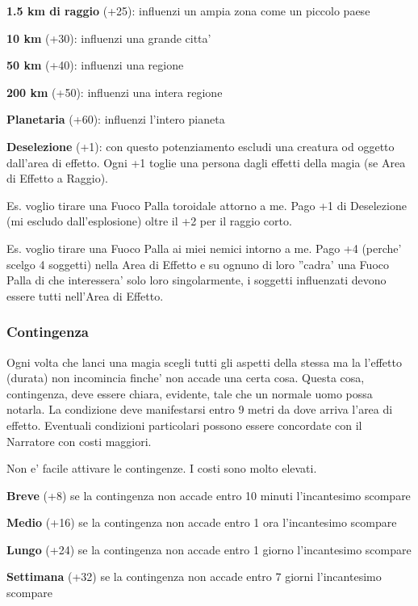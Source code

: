 \documentclass[a4paper,11pt,twoside,openany]{book}
\begin{document}
\textbf{1.5 km di raggio} (+25): influenzi un ampia zona come un piccolo paese

\textbf{10 km} (+30): influenzi una grande citta'

\textbf{50 km} (+40): influenzi una regione

\textbf{200 km} (+50): influenzi una intera regione

\textbf{Planetaria} (+60): influenzi l'intero pianeta

\textbf{Deselezione} (+1): con questo potenziamento escludi una creatura od oggetto dall'area di effetto. Ogni +1 toglie una persona dagli effetti della magia (se Area di Effetto a Raggio).

Es. voglio tirare una Fuoco Palla toroidale attorno a me. Pago +1 di Deselezione (mi escludo dall'esplosione) oltre il +2 per il raggio corto.

Es. voglio tirare una Fuoco Palla ai miei nemici intorno a me. Pago +4 (perche' scelgo 4 soggetti) nella Area di Effetto e su ognuno di loro ''cadra' una Fuoco Palla di che interessera' solo loro singolarmente, i soggetti influenzati devono essere tutti nell'Area di Effetto.

\subsubsection{Contingenza}

\label{contingenza}

Ogni volta che lanci una magia scegli tutti gli aspetti della stessa ma la l'effetto (durata) non incomincia finche' non accade una certa cosa. Questa cosa, contingenza, deve essere chiara, evidente, tale che un normale uomo possa notarla. La condizione deve manifestarsi entro 9 metri da dove arriva l'area di effetto. Eventuali condizioni particolari possono essere concordate con il Narratore con costi maggiori. 

Non e' facile attivare le contingenze. I costi sono molto elevati.

\textbf{Breve} (+8) se la contingenza non accade entro 10 minuti l'incantesimo scompare

\textbf{Medio} (+16) se la contingenza non accade entro 1 ora l'incantesimo scompare

\textbf{Lungo} (+24) se la contingenza non accade entro 1 giorno l'incantesimo scompare

\textbf{Settimana} (+32) se la contingenza non accade entro 7 giorni l'incantesimo scompare
\end{document}
